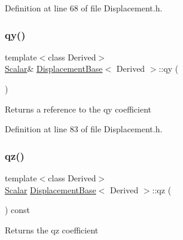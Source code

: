 Definition at line 68 of file Displacement.\+h.

\hypertarget{class_displacement_base_a89d0d16b7b3ea0d99f06278f83f1dc33}{}\label{class_displacement_base_a89d0d16b7b3ea0d99f06278f83f1dc33} 
\subsubsection{\texorpdfstring{qy()}{qy()}\hspace{0.1cm}{\footnotesize\ttfamily [2/2]}}
{\footnotesize\ttfamily template$<$class Derived$>$ \\
\hyperlink{class_displacement_base_a978caf313131fd9d221a856a2e4a80ad}{Scalar}\& \hyperlink{class_displacement_base}{Displacement\+Base}$<$ Derived $>$\+::qy (\begin{DoxyParamCaption}{ }\end{DoxyParamCaption})\hspace{0.3cm}{\ttfamily [inline]}}

\begin{DoxyReturn}{Returns}
a reference to the {\ttfamily qy} coefficient 
\end{DoxyReturn}


Definition at line 83 of file Displacement.\+h.

\hypertarget{class_displacement_base_a5fb14d5bda1d8531de6b6b2b05b52d5a}{}\label{class_displacement_base_a5fb14d5bda1d8531de6b6b2b05b52d5a} 
\subsubsection{\texorpdfstring{qz()}{qz()}\hspace{0.1cm}{\footnotesize\ttfamily [1/2]}}
{\footnotesize\ttfamily template$<$class Derived$>$ \\
\hyperlink{class_displacement_base_a978caf313131fd9d221a856a2e4a80ad}{Scalar} \hyperlink{class_displacement_base}{Displacement\+Base}$<$ Derived $>$\+::qz (\begin{DoxyParamCaption}{ }\end{DoxyParamCaption}) const\hspace{0.3cm}{\ttfamily [inline]}}

\begin{DoxyReturn}{Returns}
the {\ttfamily qz} coefficient 
\end{DoxyReturn}


